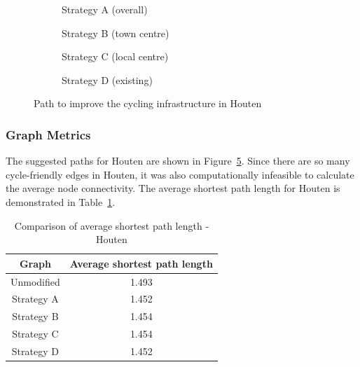 \documentclass[12pt,a4paper]{report}
\begin{document}
\begin{figure}[ht]
    \centering
    \begin{subfigure}[ht]{0.47\textwidth}
        \centering
        
        \caption{Strategy A (overall)}
        \label{fig:overall houten}
    \end{subfigure}
    \hfill
    \begin{subfigure}[ht]{0.47\textwidth}
        \centering
        
        \caption{Strategy B (town centre)}
        \label{fig:centre houten}
    \end{subfigure}
    \hfill
    \begin{subfigure}[ht]{0.47\textwidth}
        \centering
        
        \caption{Strategy C (local centre)}
        \label{fig:local houten}
    \end{subfigure}
    \hfill
    \begin{subfigure}[ht]{0.47\textwidth}
        \centering
        
        \caption{Strategy D (existing)}
        \label{fig:existing houten}
    \end{subfigure}
       \caption{Path to improve the cycling infrastructure in Houten}
       \label{fig:path houten}
\end{figure}

\subsubsection*{Graph Metrics}
The suggested paths for Houten are shown in Figure~\ref{fig:path houten}. Since there are so many cycle-friendly edges in Houten, it was also computationally infeasible to calculate the average node connectivity. The average shortest path length for Houten is demonstrated in Table~\ref{tab:avg houten}.

\begin{table}[ht!]
    \centering
    \begin{tabular}{|c|c|}
        \hline
        Graph & Average shortest path length \\
        \hline
        Unmodified & 1.493 \\
        Strategy A & 1.452 \\
        Strategy B & 1.454 \\
        Strategy C & 1.454 \\
        Strategy D & 1.452 \\
        \hline
    \end{tabular}
    \caption{Comparison of average shortest path length - Houten}
    \label{tab:avg houten}
\end{table}
\end{document}

